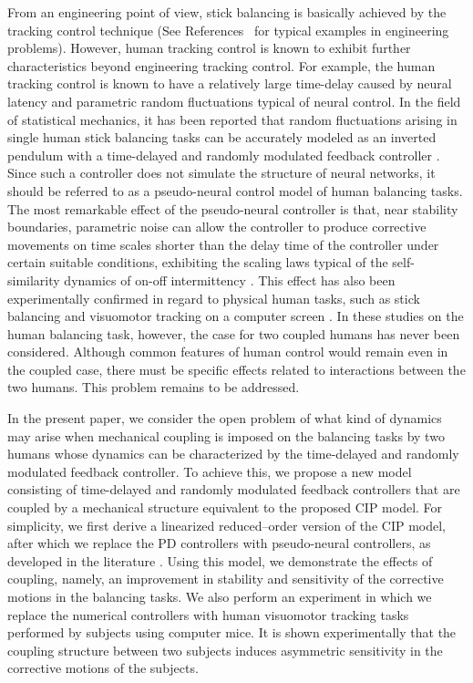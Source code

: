 \documentclass[12pt,a4paper]{ijicic}
\begin{document}
From an engineering point of view, stick balancing is basically
 achieved by the tracking control technique (See
 References~\cite{Ming2009,Chien2009} for typical examples in
 engineering problems).  However, human tracking control is known to
 exhibit further characteristics beyond engineering tracking
 control.
 For example, the human tracking control is known to have
 a relatively large time-delay caused by neural latency and parametric
 random fluctuations typical of neural control\cite{Cabrera02}.
In the field of statistical mechanics, it has been reported that random
fluctuations arising in single human stick balancing tasks can be
accurately modeled as an inverted pendulum with a time-delayed and
randomly modulated feedback controller \cite{Cabrera02}.  Since such a
controller does not simulate the structure of neural
networks\cite{campbell04,campbell06}, it should be referred to as a
pseudo-neural control model of human balancing tasks.  The most
remarkable effect of the pseudo-neural controller is that, near
stability boundaries, parametric noise can allow the controller to
produce corrective movements on time scales shorter than the delay time
of the controller under certain suitable conditions, exhibiting the
scaling laws typical of the self-similarity dynamics of on-off
intermittency \cite{Shankar96}. This effect has also been experimentally
confirmed in regard to physical human tasks, such as stick balancing
\cite{Cabrera02,Cabrera04} and visuomotor tracking on a computer screen
\cite{Bormann04}.
In these studies on the human balancing task, however, the case for two
 coupled humans has never been considered. Although common features of
 human control would remain even in the coupled case, there must be
 specific effects related to interactions between the two humans. This
 problem remains to be addressed.

 In the present paper, we consider the open problem of what kind of
 dynamics may arise when mechanical coupling is imposed on the balancing
 tasks by two humans whose dynamics can be characterized by the
 time-delayed and randomly modulated feedback controller.
To achieve this,
we propose a new model consisting of time-delayed and randomly modulated
feedback controllers that are coupled by a mechanical structure
equivalent to the proposed CIP model. For simplicity, we first derive a
linearized reduced--order version of the CIP model, after which we
replace the PD controllers with pseudo-neural controllers, as developed
in the literature \cite{Cabrera02,Cabrera04,Bormann04}. Using this
model, we demonstrate the effects of coupling, namely, an improvement in stability
and sensitivity of the corrective motions in the balancing tasks.  We
also perform an experiment in which we replace the numerical controllers
with human visuomotor tracking tasks performed by subjects using
computer mice. It is shown experimentally that the coupling structure
between two subjects induces asymmetric sensitivity in the corrective
motions of the subjects.
\end{document}
